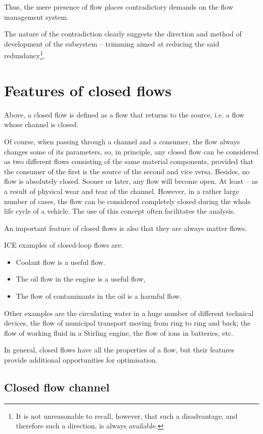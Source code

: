 \documentclass[a4paper,11pt]{article}
\begin{document}
Thus, the mere presence of flow places contradictory demands on the flow
management system.

The nature of the contradiction clearly suggests the direction and method of
development of the subsystem -- trimming aimed at reducing the said
redundancy\footnote{It is not unreasonable to recall, however, that such a
  disadvantage, and therefore such a direction, is always available.}.

\section{Features of closed flows}

Above, a closed flow is defined as a flow that returns to the source, i.e. a
flow whose channel is closed.

Of course, when passing through a channel and a consumer, the flow always
changes some of its parameters, so, in principle, any closed flow can be
considered as two different flows consisting of the same material components,
provided that the consumer of the first is the source of the second and vice
versa. Besides, no flow is absolutely closed. Sooner or later, any flow will
become open. At least -- as a result of physical wear and tear of the channel.
However, in a rather large number of cases, the flow can be considered
completely closed during the whole life cycle of a vehicle. The use of this
concept often facilitates the analysis.

An important feature of closed flows is also that they are always matter
flows.

ICE examples of closed-loop flows are:
\begin{itemize}
\item Coolant flow is a useful flow.
\item The oil flow in the engine is a useful flow,
\item The flow of contaminants in the oil is a harmful flow.
\end{itemize}
Other examples are the circulating water in a huge number of different
technical devices, the flow of municipal transport moving from ring to ring
and back; the flow of working fluid in a Stirling engine, the flow of ions in
batteries, etc.

In general, closed flows have all the properties of a flow, but their features
provide additional opportunities for optimisation.

\subsection{Closed flow channel}
\end{document}

